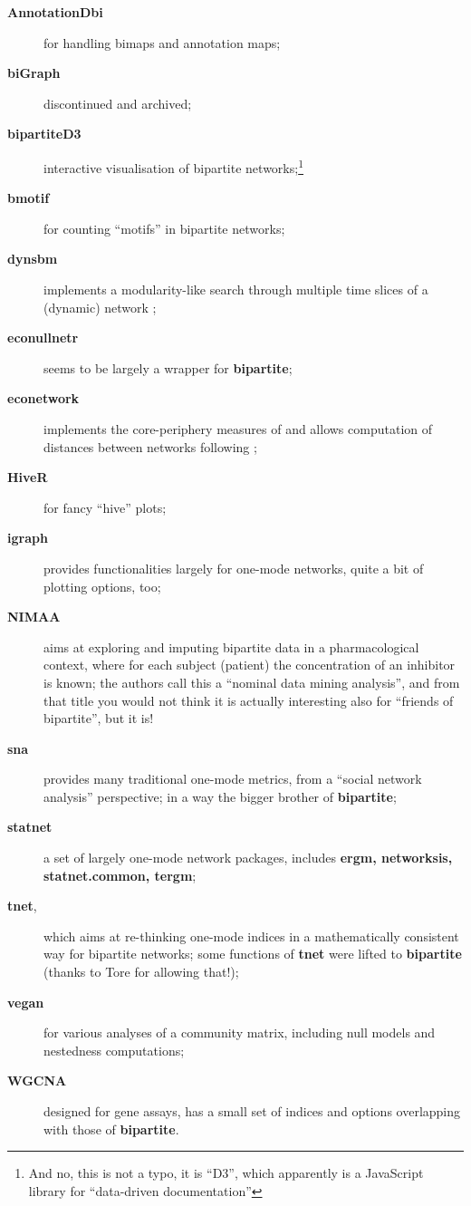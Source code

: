 \documentclass[a4paper, 11pt]{article}\usepackage[]{graphicx}\usepackage[]{color}
\newcommand{\package}[1]{\textbf{#1}}
\begin{document}
\begin{description}
\item[\package{AnnotationDbi}] for handling bimaps and annotation maps;
\item[\package{biGraph}] discontinued and archived;
\item[\package{bipartiteD3}] interactive visualisation of bipartite networks;\footnote{And no, this is not a typo, it is ``D3'', which apparently is a JavaScript library for ``data-driven documentation''}
\item[\package{bmotif}] for counting ``motifs'' in bipartite networks;
\item[\package{dynsbm}] implements a modularity-like search through multiple time slices of a (dynamic) network \citep[``dynamic stochastic block model''][]{Miele2017};
\item[\package{econullnetr}] seems to be largely a wrapper for \package{bipartite};
\item[\package{econetwork}] implements the core-periphery measures of \citet{MartinGonzalez2020} and allows computation of distances between networks following \citet{Ohlmann2019};
\item[\package{HiveR}] for fancy ``hive'' plots;
\item[\package{igraph}] provides functionalities largely for one-mode networks, quite a bit of plotting options, too;
\item[\package{NIMAA}] aims at exploring and imputing bipartite data in a pharmacological context, where for each subject (patient) the concentration of an inhibitor is known; the authors call this a ``nominal data mining analysis'', and from that title you would not think it is actually interesting also for ``friends of bipartite'', but it is!
\item[\package{sna}] provides many traditional one-mode metrics, from a ``social network analysis'' perspective; in a way the bigger brother of \package{bipartite};
\item[\package{statnet}] a set of largely one-mode network packages, includes \package{ergm, networksis, statnet.common, tergm};
\item[\package{tnet},] which aims at re-thinking one-mode indices in a mathematically consistent way for bipartite networks; some functions of \package{tnet} were lifted to \package{bipartite} (thanks to Tore for allowing that!);
\item[\package{vegan}] for various analyses of a community matrix, including null models and nestedness computations;
\item[\package{WGCNA}] designed for gene assays, has a small set of indices and options overlapping with those of \package{bipartite}.
\end{description}
\end{document}
